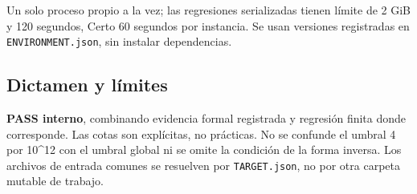 \documentclass[11pt]{article}
\begin{document}
Un solo proceso propio a la vez; las regresiones serializadas tienen
límite de 2 GiB y 120 segundos, Certo 60 segundos por instancia. Se usan
versiones registradas en \nolinkurl{ENVIRONMENT.json}, sin instalar
dependencias.

\subsection{Dictamen y límites}\label{dictamen-y-luxedmites}

\textbf{PASS interno}, combinando evidencia formal registrada y
regresión finita donde corresponde. Las cotas son explícitas, no
prácticas. No se confunde el umbral 4 por 10\^{}12 con el umbral global
ni se omite la condición de la forma inversa. Los archivos de entrada
comunes se resuelven por \nolinkurl{TARGET.json}, no por otra carpeta
mutable de trabajo.
\end{document}
